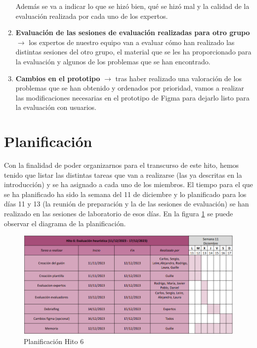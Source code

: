 \begin{enumerate}
    Además se va a indicar lo que se hizó bien, qué se hizó mal y la calidad de la evaluación realizada por cada uno de los expertos.
    \item \textbf{Evaluación de las sesiones de evaluación realizadas para otro grupo} $\rightarrow$ los expertos de nuestro equipo van a evaluar cómo han realizado las distintas sesiones
    del otro grupo, el material que se les ha proporcionado para la evaluación y algunos de los problemas que se han encontrado.
    \item \textbf{Cambios en el prototipo} $\rightarrow$ tras haber realizado una valoración de los problemas que se han obtenido y ordenados por prioridad, vamos a realizar las modificaciones
    necesarias en el prototipo de Figma para dejarlo listo para la evaluación con usuarios.
\end{enumerate}

\section{Planificación}
Con la finalidad de poder organizarnos para el transcurso de este hito, hemos tenido que listar las distintas tareas que van a realizarse (las ya descritas en la introducción) y se ha asignado a 
cada uno de los miembros. El tiempo para el que se ha planificado ha sido la semana del 11 de diciembre y lo planificado para los días 11 y 13 (la reunión de preparación y la de las sesiones de evaluación)
se han realizado en las sesiones de laboratorio de esos días. En la figura \ref{fig:planif-h6} se puede observar el diagrama de la planificación.
\begin{figure}
    \centering
    \includegraphics[width=1\textwidth]{Imagenes/Planificaciones/Planif-hito6.png}
    \caption{Planificación Hito 6}
    \label{fig:planif-h6}
\end{figure}

